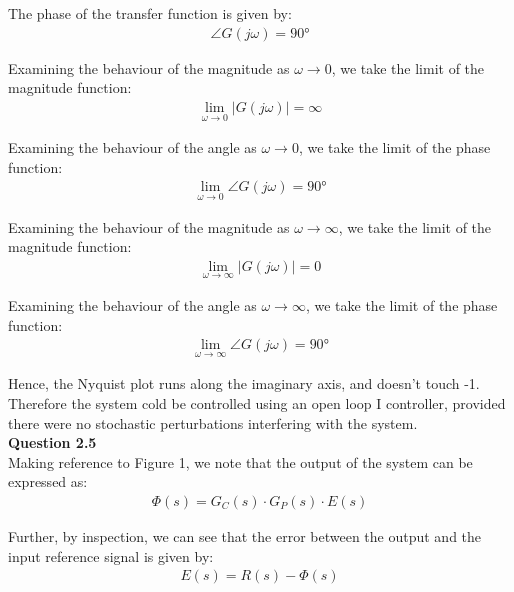 \documentclass{article}
\begin{document}
	The phase of the transfer function is given by:
	\begin{align*}
		\angle G(j \omega) = 90\si{\degree}
	\end{align*}
	
	Examining the behaviour of the magnitude as $\omega \to 0$, we take the limit of the magnitude function:
	\begin{align*}
	\lim_{\omega\to 0}|G(j \omega)| = \infty
	\end{align*}
	
	Examining the behaviour of the angle as $\omega \to 0$, we take the limit of the phase function:
	\begin{align*}
	\lim_{\omega\to 0}\angle G(j \omega) = 90 \si{\degree}
	\end{align*}
	
	Examining the behaviour of the magnitude as $\omega \to \infty$, we take the limit of the magnitude function:
	\begin{align*}
	\lim_{\omega\to \infty}|G(j \omega)| = 0
	\end{align*}
	
	Examining the behaviour of the angle as $\omega \to \infty$, we take the limit of the phase function:
	\begin{align*}
	\lim_{\omega\to \infty}\angle G(j \omega) = 90 \si{\degree}
	\end{align*}
	
	Hence, the Nyquist plot runs along the imaginary axis, and doesn't touch -1. Therefore the system cold be controlled using an open loop I controller, provided there were no stochastic perturbations interfering with the system.\\
	
	\textbf{Question 2.5}\\
	
    Making reference to Figure 1, we note that the output of the system can be expressed as:
    \begin{align}
	    \Phi(s) = G_C(s) \cdot G_P(s) \cdot E(s)
    \end{align}
	
	Further, by inspection, we can see that the error between the output and the input reference signal is given by:
	\begin{align}
		E(s) = R(s) - \Phi(s)
	\end{align}
	
\end{document}
